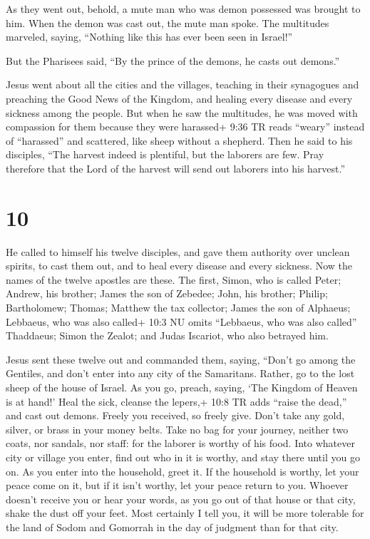  As they went out, behold, a mute man who was demon
possessed was brought to him.  When the demon was cast out,
the mute man spoke. The multitudes marveled, saying, ``Nothing like this
has ever been seen in Israel!''

 But the Pharisees said, ``By the prince of the demons, he
casts out demons.''

 Jesus went about all the cities and the villages, teaching
in their synagogues and preaching the Good News of the Kingdom, and
healing every disease and every sickness among the people. 
But when he saw the multitudes, he was moved with compassion for them
because they were harassed+ 9:36 TR reads ``weary'' instead of
``harassed'' and scattered, like sheep without a shepherd. 
Then he said to his disciples, ``The harvest indeed is plentiful, but
the laborers are few.  Pray therefore that the Lord of the
harvest will send out laborers into his harvest.''

\hypertarget{section-9}{%
\section{10}\label{section-9}}

 He called to himself his twelve disciples, and gave them
authority over unclean spirits, to cast them out, and to heal every
disease and every sickness.  Now the names of the twelve
apostles are these. The first, Simon, who is called Peter; Andrew, his
brother; James the son of Zebedee; John, his brother; 
Philip; Bartholomew; Thomas; Matthew the tax collector; James the son of
Alphaeus; Lebbaeus, who was also called+ 10:3 NU omits ``Lebbaeus, who
was also called'' Thaddaeus;  Simon the Zealot; and Judas
Iscariot, who also betrayed him.

 Jesus sent these twelve out and commanded them, saying,
``Don't go among the Gentiles, and don't enter into any city of the
Samaritans.  Rather, go to the lost sheep of the house of
Israel.  As you go, preach, saying, `The Kingdom of Heaven
is at hand!'  Heal the sick, cleanse the lepers,+ 10:8 TR
adds ``raise the dead,'' and cast out demons. Freely you received, so
freely give.  Don't take any gold, silver, or brass in your
money belts.  Take no bag for your journey, neither two
coats, nor sandals, nor staff: for the laborer is worthy of his food.
 Into whatever city or village you enter, find out who in
it is worthy, and stay there until you go on.  As you enter
into the household, greet it.  If the household is worthy,
let your peace come on it, but if it isn't worthy, let your peace return
to you.  Whoever doesn't receive you or hear your words, as
you go out of that house or that city, shake the dust off your feet.
 Most certainly I tell you, it will be more tolerable for
the land of Sodom and Gomorrah in the day of judgment than for that
city.

